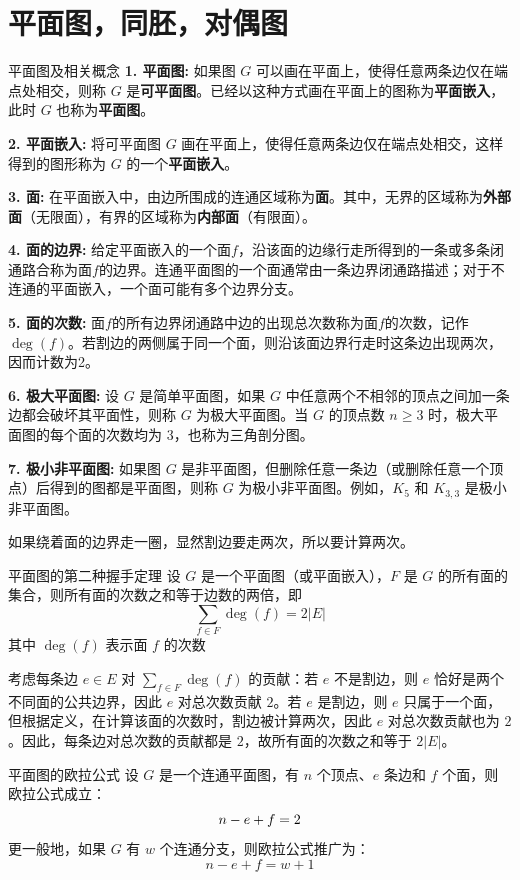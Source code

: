 \documentclass[lang=cn,11pt]{elegantbook}
\begin{document}
\section{平面图，同胚，对偶图}
\begin{definition}{平面图及相关概念}
\textbf{1. 平面图:}
如果图 $G$ 可以画在平面上，使得任意两条边仅在端点处相交，则称 $G$ 是\textbf{可平面图}。已经以这种方式画在平面上的图称为\textbf{平面嵌入}，此时 $G$ 也称为\textbf{平面图}。

\textbf{2. 平面嵌入:}
将可平面图 $G$ 画在平面上，使得任意两条边仅在端点处相交，这样得到的图形称为 $G$ 的一个\textbf{平面嵌入}。

\textbf{3. 面:}
在平面嵌入中，由边所围成的连通区域称为\textbf{面}。其中，无界的区域称为\textbf{外部面}（无限面），有界的区域称为\textbf{内部面}（有限面）。

\textbf{4. 面的边界:}
给定平面嵌入的一个面$f$，沿该面的边缘行走所得到的一条或多条闭通路合称为面$f$的边界。连通平面图的一个面通常由一条边界闭通路描述；对于不连通的平面嵌入，一个面可能有多个边界分支。

\textbf{5. 面的次数:}
面$f$的所有边界闭通路中边的出现总次数称为面$f$的次数，记作$\deg(f)$。若割边的两侧属于同一个面，则沿该面边界行走时这条边出现两次，因而计数为2。

\textbf{6. 极大平面图:}
设 $G$ 是简单平面图，如果 $G$ 中任意两个不相邻的顶点之间加一条边都会破坏其平面性，则称 $G$ 为极大平面图。当 $G$ 的顶点数 $n\geqslant 3$ 时，极大平面图的每个面的次数均为 3，也称为三角剖分图。

\textbf{7. 极小非平面图:}
如果图 $G$ 是非平面图，但删除任意一条边（或删除任意一个顶点）后得到的图都是平面图，则称 $G$ 为极小非平面图。例如，$K_5$ 和 $K_{3,3}$ 是极小非平面图。
\end{definition}
如果绕着面的边界走一圈，显然割边要走两次，所以要计算两次。
\begin{theorem}{平面图的第二种握手定理}
设 $G$ 是一个平面图（或平面嵌入），$F$ 是 $G$ 的所有面的集合，则所有面的次数之和等于边数的两倍，即
\[
\sum_{f \in F} \deg(f) = 2|E|
\]
其中 $\deg(f)$ 表示面 $f$ 的次数
\end{theorem}
考虑每条边 $e \in E$ 对 $\sum_{f \in F} \deg(f)$ 的贡献：若 $e$ 不是割边，则 $e$ 恰好是两个不同面的公共边界，因此 $e$ 对总次数贡献 $2$。若 $e$ 是割边，则 $e$ 只属于一个面，但根据定义，在计算该面的次数时，割边被计算两次，因此 $e$ 对总次数贡献也为 $2$。因此，每条边对总次数的贡献都是 $2$，故所有面的次数之和等于 $2|E|$。
\begin{theorem}{平面图的欧拉公式}
设 $G$ 是一个连通平面图，有 $n$ 个顶点、$e$ 条边和 $f$ 个面，则欧拉公式成立：\vspace{-10pt}
\[
n - e + f = 2\vspace{-10pt}
\]
更一般地，如果 $G$ 有 $w$ 个连通分支，则欧拉公式推广为：\vspace{-10pt}
\[
n - e + f = w + 1
\]
\end{theorem}
\end{document}
